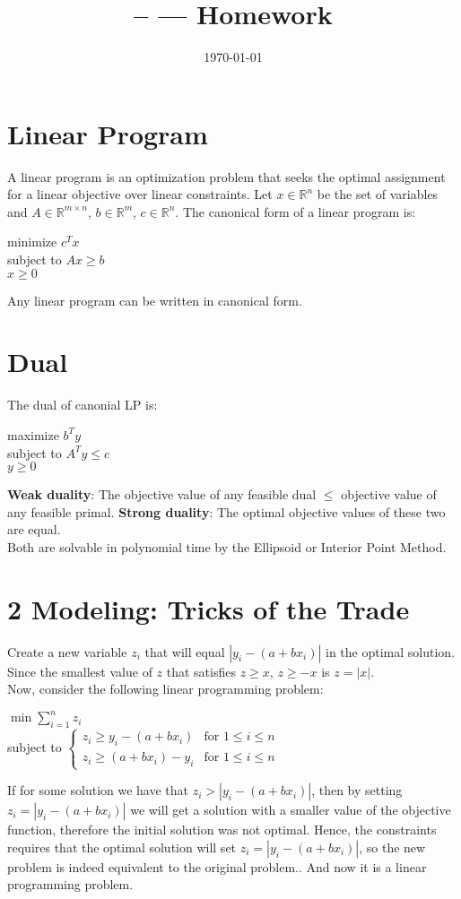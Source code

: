 \documentclass[11pt]{article}
\title{\Class-- \Session --- Homework \Homework}
\author{\Name}
\date{\today}
\begin{document}
	\maketitle
	\section*{Linear Program}
	A linear  program is an optimization problem that seeks the optimal assignment for a linear objective over linear constraints. Let $x\in \mathbb{R}^n$ be the set of variables and $A \in \mathbb{R}^{m\times n}$, $b\in \mathbb{R}^m$, $c\in \mathbb{R}^n$. The canonical form of a linear program is:
	\begin{center}
		minimize $c^{T}x$\\
		subject to $Ax \geq b$\\
		$x\geq 0$
	\end{center}
	Any linear program can be written in canonical form.
	
	\section*{Dual}
	The dual of canonial LP is:
	\begin{center}
		maximize $b^{T}y$\\
		subject to $A^Ty \leq c$\\
		$y\geq 0$
	\end{center}
	\textbf{Weak duality}: The objective value of any feasible dual $\leq$ objective value of any feasible primal.
	\textbf{Strong duality}: The optimal objective values of these two are equal.\\
	Both are solvable in polynomial time by the Ellipsoid or Interior Point Method.
	
	\section*{2  Modeling: Tricks of the Trade}
	Create a new variable $z_i$ that will equal $|y_i − (a + bx_i)|$ in the optimal solution.\\
	Since the smallest value of $z$ that satisfies $z \geq x$, $z \geq -x$ is $z = |x|$.\\
	Now, consider the following linear programming problem:
	\begin{center}
		$\min \sum_{i=1}^{n}z_i$\\
		subject to $\begin{cases}
			z_i \geq y_i - (a+bx_i) & \text{for } 1 \leq i \leq n\\
			z_i \geq (a+bx_i) - y_i & \text{for } 1 \leq i \leq n
		\end{cases}$\\
	\end{center}
	If for some solution we have that $z_i > |y_i − (a + bx_i)|$, then by setting $z_i = |y_i − (a + bx_i)|$ we will get a solution with a smaller value of the objective function, therefore the initial solution was not optimal. Hence, the constraints requires that the optimal solution will set $z_i = |y_i−(a+bx_i)|$, so the new problem is indeed equivalent to the original problem.. And now it is a linear programming problem.
	
\end{document}
